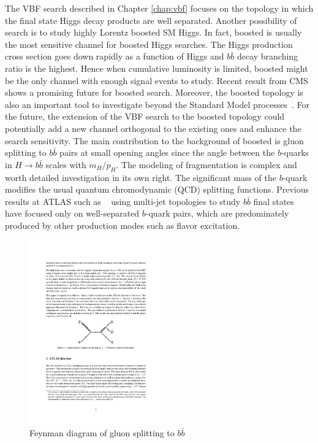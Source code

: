 The VBF \Hbb search described in Chapter \ref{chap:vbf} focuses on the topology in which the final state Higgs decay products are well separated. Another possibility of \Hbb search is to study highly Lorentz boosted SM Higgs. In fact, boosted \Hbb is usually the most sensitive channel for boosted Higgs searches. The Higgs production cross section goes down rapidly as a function of Higgs \pt and $b\bar b$ decay branching ratio is the highest. Hence when cumulative luminosity is limited, boosted \Hbb might be the only channel with enough signal events to study. Recent result from CMS \cite{Aaboud:2017ecz} shows a promising future for boosted \Hbb search. Moreover, the boosted \Hbb topology is also an important tool to investigate beyond the Standard Model processes~\cite{Aaboud:2017ahz,Aaboud:2017yqz,Aaboud:2016xco,Khachatryan:2016cfa,Sirunyan:2017nrt}. For the future, the extension of the VBF \Hbb search to the boosted topology could potentially add a new channel orthogonal to the existing ones and enhance the search sensitivity. The main contribution to the background of boosted \Hbb is gluon splitting to $b \bar{b}$ pairs at small opening angles since the angle between the $b$-quarks in $H\rightarrow b\bar{b}$ scales with $m_H/p_H$. The modeling of \gbb fragmentation is complex and worth detailed investigation in its own right. The significant mass of the $b$-quark modifies the usual quantum chromodynamic (QCD) splitting functions. Previous results at ATLAS such as ~\cite{Aaboud:2016jed} using multi-jet topologies to study $b\bar b$ final states have focused only on well-separated $b$-quark pairs, which are predominately produced by other production modes such as flavor excitation.


\begin{figure}[htbp]
  \centering
 \includegraphics[width=0.5\textwidth]{figures/gbb/gbb_feynman}
\caption{Feynman diagram of gluon splitting to $b\bar{b}$}
  \label{fig:gbb-feynman}
\end{figure}


